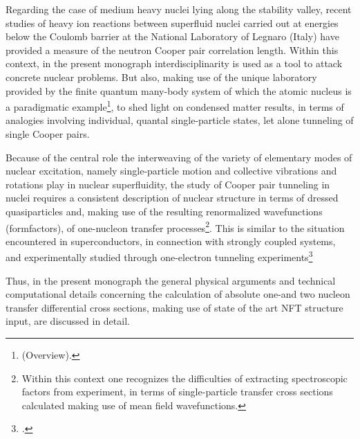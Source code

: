 Regarding the case of medium heavy nuclei lying along the stability valley, recent studies of heavy ion reactions between superfluid nuclei carried out at energies below the Coulomb barrier at the National Laboratory of Legnaro (Italy) have provided a measure of the neutron Cooper pair correlation length. Within this context, in the present monograph interdisciplinarity is used as a tool to attack concrete nuclear problems. But also, making use of the unique laboratory provided by the finite quantum many-body system of which the atomic nucleus is a paradigmatic example\footnote{\cite{Bohr:19} (Overview).}, to shed light on condensed matter results, in terms of analogies involving individual, quantal single-particle states, let alone tunneling of single Cooper pairs.


Because of the central role the interweaving of the variety of elementary modes of nuclear excitation, namely single-particle motion and collective vibrations and rotations play in nuclear superfluidity, the study of Cooper pair tunneling in nuclei requires  a consistent description of nuclear structure in terms of dressed quasiparticles and, making use of the resulting renormalized wavefunctions (formfactors),  of one-nucleon transfer processes\footnote{Within this context one recognizes the difficulties of extracting spectroscopic factors from experiment, in terms of single-particle transfer cross sections calculated making use of mean field wavefunctions.}. This is similar to the situation encountered in superconductors, in connection with strongly coupled systems, and experimentally studied through one-electron tunneling experiments\footnote{\cite{Giaver:73}.} 

Thus, in the present monograph the general physical arguments and technical computational details concerning the   calculation of  absolute one-and two nucleon  transfer differential cross sections, making use of state of the art NFT structure input, are discussed in detail. 


